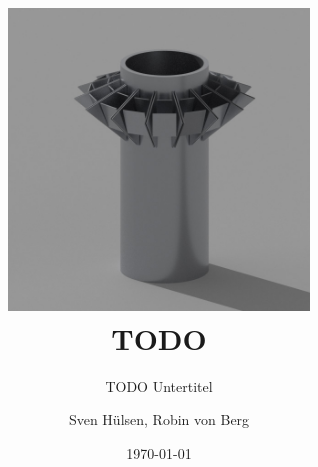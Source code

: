 \documentclass[11pt,oneside,headsepline,a4paper,ngerman]{scrreprt}
\newcommand{\vcontext}{Cross-Innovation-Class 2022}
\newcommand{\vprof}{Prof. Hoffmann}
\newcommand{\vsubject}{Projektbericht Team Frankfurt}
\newcommand{\vtitle}{TODO}
\newcommand{\vsubtitle}{TODO Untertitel}
\newcommand{\vauthor}{Sven Hülsen, Robin von Berg}
\begin{document}
\titlehead{\vcontext{}\\\vprof{}}
\subject{\vsubject{}}
\title{\includegraphics[width=8cm]{media/01_project/render_bin.jpg}\\\vtitle{}}
\subtitle{\vsubtitle{}}
\author{\vauthor{}}
\date{\today}

\maketitle


\tableofcontents









\setcounter{biburlnumpenalty}{8000}

\printbibliography{}

\listoffigures{}
\end{document}
